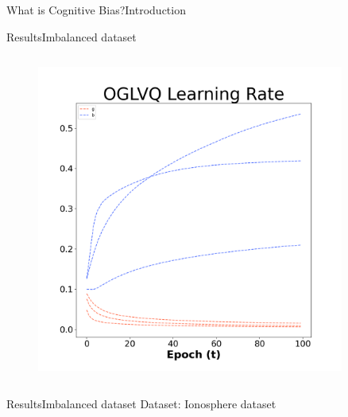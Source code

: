 \documentclass[
	aspectratio=169,	%
	onlytextwidth,		%
	t,					%
	]{beamer}
\begin{document}
\begin{frame}[fragile]{What is Cognitive Bias?}{Introduction}
\begin{frame}[fragile]{Results}{Imbalanced dataset}
\begin{columns}
			\begin{column}[T]{0.33\textwidth}
				\begin{figure}
					\includegraphics[width=0.9\textwidth]{myfigs/OGLVQ_i.png}
				\end{figure}
			\end{column}
			
			
		\end{columns}
		
		\centering		\color{red}{Be careful with y-axis, since they do not share common size}
		
	\end{frame}
	
	\begin{frame}[fragile]{Results}{Imbalanced dataset} 
		\scriptsize
		Dataset: Ionosphere dataset~\cite{ion} 
		\newline
		\begin{columns}
			

\end{columns}
\end{frame}
\end{frame}
\end{document}
